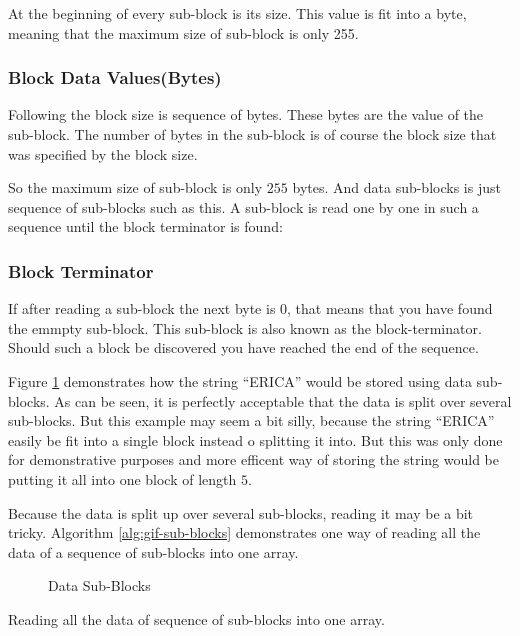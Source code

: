 \begin{refsection}
  At the beginning of every sub-block is its size. This value is fit
  into a byte, meaning that the maximum size of sub-block is only
  255.

  \subsubsection*{Block Data Values(Bytes)}

  Following the block size is sequence of bytes. These bytes are the
  value of the sub-block. The number of bytes in the sub-block is of
  course the block size that was specified by the block size.

  So the maximum size of sub-block is only $255$ bytes. And data
  sub-blocks is just sequence of sub-blocks such as this. A sub-block
  is read one by one in such a sequence until the block terminator is found:

  \subsubsection*{Block Terminator}

  If after reading a sub-block the next byte is 0, that means that you
  have found the emmpty sub-block. This sub-block is also known as the
  block-terminator. Should such a block be discovered you have reached
  the end of the sequence.

  Figure \ref{fig:gif-data-sub-blocks} demonstrates how the string
  ``ERICA'' would be stored using data sub-blocks. As can be seen, it
  is perfectly acceptable that the data is split over several
  sub-blocks. But this example may seem a bit silly, because the
  string ``ERICA'' easily be fit into a single block instead o
  splitting it into. But this was only done for demonstrative purposes
  and more efficent way of storing the string would be putting it all
  into one block of length $5$.

  Because the data is split up over several sub-blocks, reading it may
  be a bit tricky. Algorithm \ref{alg:gif-sub-blocks} demonstrates one way of reading all the
  data of a sequence of sub-blocks into one array.

  \begin{figure}
    \centering
    \caption{\gif Data Sub-Blocks}
    \label{fig:gif-data-sub-blocks}
  \end{figure}


  \begin{algorithm}[H]
    \caption{Reading all the data of sequence of sub-blocks into one array.}
    \label{alg:gif-sub-blocks}
    \begin{algorithmic}[1]
      \Repeat
      \EndRepeatn


\end{algorithmic}
\end{algorithm}
\end{refsection}
